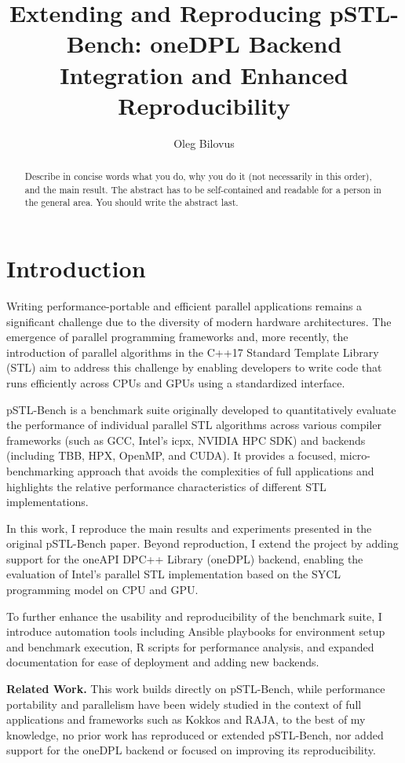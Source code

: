 \documentclass[sigconf]{acmart}
\title{Extending and Reproducing pSTL-Bench: oneDPL Backend Integration and Enhanced Reproducibility}
\author{Oleg Bilovus}
\affiliation{
  \institution{Department of Computer Science, University of Salerno}
  \city{Fisciano (SA)}
  \country{Italy}
}
\newcommand{\mypar}[1]{{\bf #1.}}
\begin{document}
\begin{abstract}
  Describe in concise words what you do, why you do it (not necessarily
  in this order), and the main result.  The abstract has to be
  self-contained and readable for a person in the general area. You
  should write the abstract last.
\end{abstract}

\maketitle

\section{Introduction}\label{sec:intro}
Writing performance-portable and efficient parallel applications remains a
significant challenge due to the diversity of modern hardware architectures.
The emergence of parallel programming frameworks and, more recently, the
introduction of parallel algorithms in the C++17 Standard Template Library
(STL) aim to address this challenge by enabling developers to write code that
runs efficiently across CPUs and GPUs using a standardized interface.

pSTL-Bench\cite{pSTL-Bench} is a benchmark suite originally developed to
quantitatively evaluate the performance of individual parallel STL algorithms
across various compiler frameworks (such as GCC, Intel's icpx, NVIDIA HPC SDK)
and backends (including TBB, HPX, OpenMP, and CUDA). It provides a focused,
micro-benchmarking approach that avoids the complexities of full applications
and highlights the relative performance characteristics of different STL
implementations.

In this work, I reproduce the main results and experiments presented in the
original pSTL-Bench paper. Beyond reproduction, I extend the project by adding
support for the oneAPI DPC++ Library (oneDPL) backend, enabling the evaluation
of Intel’s parallel STL implementation based on the SYCL programming model on
CPU and GPU.

To further enhance the usability and reproducibility of the benchmark suite, I
introduce automation tools including Ansible playbooks for environment setup
and benchmark execution, R scripts for performance analysis, and expanded
documentation for ease of deployment and adding new backends.

\mypar{Related Work} This work builds directly on pSTL-Bench,
while performance portability and parallelism have been widely studied in
the context of full applications and frameworks such as Kokkos\cite{Kokkos}
and RAJA\cite{RAJA}, to the best of my knowledge, no prior work has reproduced or
extended pSTL-Bench, nor added support for the oneDPL backend or focused on improving
its reproducibility.
\end{document}
